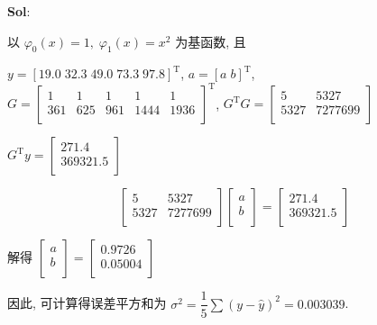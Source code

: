 \textbf{Sol}:  

以 $\varphi_0(x)=1,\;\varphi_1(x)=x^2$ 为基函数, 且

$y=[19.0\;32.3\;49.0\;73.3\;97.8]^{\text{T}}$, $a=[a\;b]^{\text{T}}$, $G=\begin{bmatrix}
    1&1&1&1&1\\
    361&625&961&1444&1936\\
\end{bmatrix}^{\text{T}}$, $G^{\text{T}}G=\begin{bmatrix}
    5&5327\\
    5327&7277699\\
\end{bmatrix}$

$G^{\text{T}}y=\begin{bmatrix}
    271.4\\369321.5\\
\end{bmatrix}$

$$
\begin{bmatrix}
    5&5327\\
    5327&7277699\\
\end{bmatrix}\begin{bmatrix}
    a\\b\\
\end{bmatrix}=\begin{bmatrix}
    271.4\\369321.5\\
\end{bmatrix}
$$

\vspace{120pt}

解得 $\begin{bmatrix}
    a\\b\\
\end{bmatrix}=\begin{bmatrix}
    0.9726\\0.05004\\
\end{bmatrix}$

因此, 可计算得误差平方和为 $\sigma^2=\dfrac{1}{5}\sum(y-\hat{y})^2=0.003039$.

\vspace{12pt}



